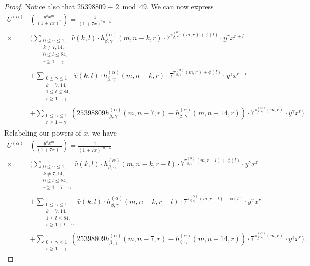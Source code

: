 \documentclass[reqno]{amsart}
\theoremstyle{definition}
\theoremstyle{remark}
\numberwithin{equation}{section}
\begin{document}
\begin{proof}
Notice also that $25398809\equiv 2\bmod{49}$.  We can now express
\begin{align}
U^{(\alpha)}&\left( \frac{y^{\beta}x^{m}}{(1+7x)^{n}} \right) = \frac{1}{(1+7x)^{7n+\kappa}}\nonumber\\
\times & \Bigg(\sum_{\substack{0\le\gamma\le 1,\\ k\neq 7,14,\\ 0\le l\le 84,\\ r\ge 1-\gamma}} \hat{v}(k,l)\cdot h^{(\alpha)}_{\beta,\gamma}(m,n-k,r)\cdot 7^{\pi^{(\alpha)}_{\beta,\gamma}(m,r) + \phi(l)}\cdot y^{\gamma}x^{r+l}\label{reliancenm5a3}\\
&+\sum_{\substack{0\le\gamma\le 1\\ k=7,14,\\ 1\le l\le 84,\\ r\ge 1-\gamma}} \hat{v}(k,l)\cdot h^{(\alpha)}_{\beta,\gamma}(m,n-k,r)\cdot 7^{\pi^{(\alpha)}_{\beta,\gamma}(m,r) + \phi(l)}\cdot y^{\gamma}x^{r+l}\label{reliancenm5a2}\\
&+\sum_{\substack{0\le\gamma\le 1\\ r\ge 1-\gamma}}\left( 25398809 h^{(\alpha)}_{\beta,\gamma}(m,n-7,r) - h^{(\alpha)}_{\beta,\gamma}(m,n-14,r)\right)\cdot 7^{\pi^{(\alpha)}_{\beta,\gamma}(m,r)} \cdot y^{\gamma}x^{r}\Bigg).\label{reliancenm5a}
\end{align}  Relabeling our powers of $x$, we have
\begin{align}
U^{(\alpha)}&\left( \frac{y^{\beta}x^{m}}{(1+7x)^{n}} \right) = \frac{1}{(1+7x)^{7n+\kappa}}\nonumber\\
\times & \Bigg(\sum_{\substack{0\le\gamma\le 1,\\ k\neq 7,14,\\ 0\le l\le 84,\\ r\ge 1+l-\gamma}} \hat{v}(k,l)\cdot h^{(\alpha)}_{\beta,\gamma}(m,n-k,r-l)\cdot 7^{\pi^{(\alpha)}_{\beta,\gamma}(m,r-l) + \phi(l)}\cdot y^{\gamma}x^{r}\label{reliancenm5a3b}\\
&+\sum_{\substack{0\le\gamma\le 1\\ k=7,14,\\ 1\le l\le 84,\\ r\ge 1+l-\gamma}} \hat{v}(k,l)\cdot h^{(\alpha)}_{\beta,\gamma}(m,n-k,r-l)\cdot 7^{\pi^{(\alpha)}_{\beta,\gamma}(m,r-l) + \phi(l)}\cdot y^{\gamma}x^{r}\label{reliancenm5a2b}\\
&+\sum_{\substack{0\le\gamma\le 1\\ r\ge 1-\gamma}}\left( 25398809 h^{(\alpha)}_{\beta,\gamma}(m,n-7,r) - h^{(\alpha)}_{\beta,\gamma}(m,n-14,r)\right)\cdot 7^{\pi^{(\alpha)}_{\beta,\gamma}(m,r)} \cdot y^{\gamma}x^{r}\Bigg).\label{reliancenm5b}

\end{align}
\end{proof}
\end{document}
